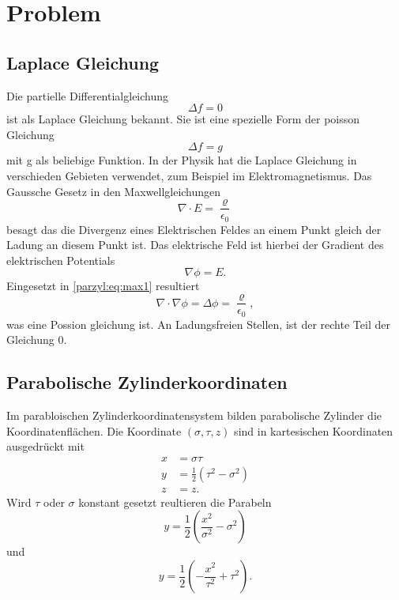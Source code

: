 %
%
%
\section{Problem\label{parzyl:section:teil0}}

\subsection{Laplace Gleichung}
Die partielle Differentialgleichung
\begin{equation}
    \Delta f = 0
\end{equation}
ist als Laplace Gleichung bekannt.
Sie ist eine spezielle Form der poisson Gleichung
\begin{equation}
    \Delta f = g
\end{equation}
mit g als beliebige Funktion.
In der Physik hat die Laplace Gleichung in verschieden Gebieten
verwendet, zum Beispiel im Elektromagnetismus.
Das Gaussche Gesetz in den Maxwellgleichungen 
\begin{equation}
     \nabla \cdot E = \frac{\varrho}{\epsilon_0}
\label{parzyl:eq:max1}
\end{equation}
besagt das die Divergenz eines Elektrischen Feldes an einem 
Punkt gleich der Ladung an diesem Punkt ist.
Das elektrische Feld ist hierbei der Gradient des elektrischen
Potentials
\begin{equation}
    \nabla \phi = E.
\end{equation}
Eingesetzt in \eqref{parzyl:eq:max1} resultiert
\begin{equation}
    \nabla \cdot \nabla \phi = \Delta \phi = \frac{\varrho}{\epsilon_0},
\end{equation}
was eine Possion gleichung ist.
An Ladungsfreien Stellen, ist der rechte Teil der Gleichung $0$. 
\subsection{Parabolische Zylinderkoordinaten
\label{parzyl:subsection:finibus}}
Im parabloischen Zylinderkoordinatensystem bilden parabolische Zylinder die Koordinatenflächen.
Die Koordinate $(\sigma, \tau, z)$ sind in kartesischen Koordinaten ausgedrückt mit
\begin{align}
    x & = \sigma \tau \\
    \label{parzyl:coordRelationsa}
    y & = \frac{1}{2}\left(\tau^2 - \sigma^2\right) \\
    z & = z.
    \label{parzyl:coordRelationse}
\end{align}
Wird $\tau$ oder $\sigma$ konstant gesetzt reultieren die Parabeln
\begin{equation}
    y = \frac{1}{2} \left( \frac{x^2}{\sigma^2} - \sigma^2 \right)
\end{equation}
und 
\begin{equation}
    y = \frac{1}{2} \left( -\frac{x^2}{\tau^2} + \tau^2 \right).
\end{equation}


